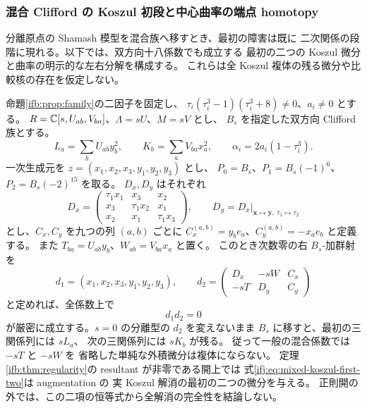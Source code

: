 \subsubsection{混合 Clifford の Koszul 初段と中心曲率の端点 homotopy}
\label{ifj:subsubsec:mixed-koszul-endpoints}

分離原点の Shamash 模型を混合族へ移すとき、最初の障害は既に
二次関係の段階に現れる。以下では、双方向十八係数でも成立する
最初の二つの Koszul 微分と曲率の明示的な左右分解を構成する。
これらは全 Koszul 複体の残る微分や比較核の存在を仮定しない。

\begin{proposition}
\label{ifj:prop:mixed-koszul-endpoints}
命題\ref{ifb:prop:family}の二因子を固定し、
$\tau_i(\tau_i^3-1)(\tau_i^3+8)\ne0$、$a_i\ne0$ とする。
$R=\mathbb C[s,U_{ab},V_{ba}]$、$\Lambda=sU$、$M=sV$ とし、
$B_s$ を指定した双方向 Clifford 族とする。
\[
 L_a=\sum_bU_{ab}y_b^2,\qquad K_b=\sum_aV_{ba}x_a^2,
 \qquad \alpha_i=2a_i(1-\tau_i^3).
\]
一次生成元を $z=(x_1,x_2,x_3,y_1,y_2,y_3)$ とし、
$P_0=B_s$、$P_1=B_s(-1)^6$、$P_2=B_s(-2)^{15}$ を取る。
$D_x,D_y$ はそれぞれ
\[
 D_x=\begin{pmatrix}
 \tau_1x_1&x_3&x_2\\
 x_3&\tau_1x_2&x_1\\
 x_2&x_1&\tau_1x_3
 \end{pmatrix},\qquad
 D_y=D_x\big|_{\mathbf x\mapsto\mathbf y,\ \tau_1\mapsto\tau_2}
\]
とし、$C_x,C_y$ を九つの列 $(a,b)$ ごとに
$C_x^{(a,b)}=y_be_a$、$C_y^{(a,b)}=-x_ae_b$ と定義する。
また $T_{ba}=U_{ab}y_b$、$W_{ab}=V_{ba}x_a$ と置く。
このとき次数零の右 $B_s$-加群射を
\begin{equation}\label{ifj:eq:mixed-koszul-first-two}
 d_1=(x_1,x_2,x_3,y_1,y_2,y_3),\qquad
 d_2=\begin{pmatrix}
       D_x&-sW&C_x\\
       -sT&D_y&C_y
      \end{pmatrix}
\end{equation}
と定めれば、全係数上で
\begin{equation}\label{ifj:eq:mixed-koszul-d1d2}
                         d_1d_2=0
\end{equation}
が厳密に成立する。$s=0$ の分離型の $d_2$ を変えないまま
$B_s$ に移すと、最初の三関係列には $sL_a$、
次の三関係列には $sK_b$ が残る。
従って一般の混合係数では $-sT$ と $-sW$ を
省略した単純な外積微分は複体にならない。
定理\ref{ifb:thm:regularity}の resultant が非零である開上では
式\eqref{ifj:eq:mixed-koszul-first-two}は augmentation の
実 Koszul 解消の最初の二つの微分を与える。
正則開の外では、この二項の恒等式から全解消の完全性を結論しない。


\end{proposition}
